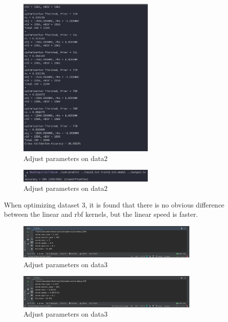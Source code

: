 \documentclass[11pt]{article}
\begin{document}
\begin{figure}[H]
    \centering
    \includegraphics[width=0.6\textwidth]{d2p2}
    \caption{Adjust parameters on data2}
\end{figure}

\begin{figure}[H]
    \centering
    \includegraphics[width=0.6\textwidth]{d2p2-2}
    \caption{Adjust parameters on data2}
\end{figure}

When optimizing dataset 3, it is found that there is no obvious difference between the linear and rbf kernels, but the linear speed is faster.\\

\begin{figure}[H]
    \centering
    \includegraphics[width=0.8\textwidth]{d3p1}
    \caption{Adjust parameters on data3}
\end{figure}

\begin{figure}[H]
    \centering
    \includegraphics[width=0.8\textwidth]{d3p2}
    \caption{Adjust parameters on data3}
\end{figure}
\end{document}
